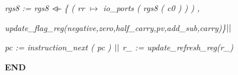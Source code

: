 \documentclass[a4paper]{llncs}
\begin{document}
\hspace*{0.40in}\it rgs8 \rm := \it rgs8  $\lover$  \rm \{ \rm ( \it rr  $\mapsto$  \it io\_ports \rm ( \it rgs8 \rm ( \it c0 \rm ) \rm ) \rm ) \rm ,

\hspace*{0.40in}\it update\_flag\_reg\rm (\it negative\rm,\it zero\rm,\it half\_carry\rm,\it pv\rm,\it add\_sub\rm,\it carry)\rm\}$\mbox{$\mid\mid$}$

\hspace*{0.40in}\it pc \rm := \it instruction\_next \rm ( \it pc \rm )  $\mbox{$\mid\mid$}$  \it r\_ \rm := \it update\_refresh\_reg\rm (\it r\_\rm )

\hspace*{0.0in}\bf END \rm


\end{document}
